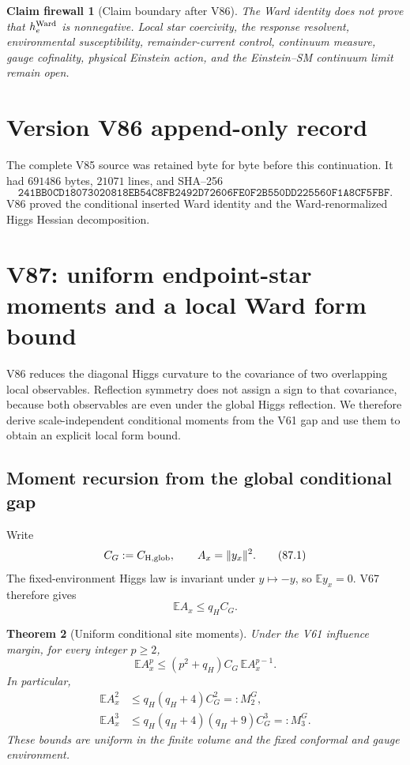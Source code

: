 \documentclass[11pt]{article}
\newtheorem{theorem}{Theorem}[section]
\newtheorem{firewall}[theorem]{Claim firewall}
\theoremstyle{remark}
\begin{document}
\begin{firewall}[Claim boundary after V86]
\label{fire:v17v86}
The Ward identity does not prove that \(h_e^{\rm Ward}\) is
nonnegative.  Local star coercivity, the response resolvent,
environmental susceptibility, remainder-current control, continuum
measure, gauge cofinality, physical Einstein action, and the
Einstein--SM continuum limit remain open.
\end{firewall}

\section*{Version V86 append-only record}
The complete V85 source was retained byte for byte before this
continuation.  It had \(691486\) bytes, \(21071\) lines, and SHA--256
\[
 \texttt{241BB0CD18073020818EB54C8FB2492D72606FE0F2B550DD225560F1A8CF5FBF}.
\]
V86 proved the conditional inserted Ward identity and the
Ward-renormalized Higgs Hessian decomposition.


\section{V87: uniform endpoint-star moments and a local Ward form bound}
\label{sec:v17v87}

V86 reduces the diagonal Higgs curvature to the covariance of two
overlapping local observables.  Reflection symmetry does not assign a
sign to that covariance, because both observables are even under the
global Higgs reflection.  We therefore derive scale-independent
conditional moments from the V61 gap and use them to obtain an explicit
local form bound.

\subsection{Moment recursion from the global conditional gap}

Write
\[
 C_G:=C_{\rm H,glob},
 \qquad A_x=\|y_x\|^2.                             \tag{87.1}
\]
The fixed-environment Higgs law is invariant under
\(y\mapsto-y\), so \(\mathbb Ey_x=0\).  V67 therefore gives
\[
 \mathbb EA_x\leq q_HC_G.                         \tag{87.2}
\]

\begin{theorem}[Uniform conditional site moments]
\label{thm:v17v87-moments}
Under the V61 influence margin, for every integer \(p\geq2\),
\[
\boxed{
 \mathbb EA_x^p
 \leq(p^2+q_H)C_G\,\mathbb EA_x^{p-1}.}           \tag{87.3}
\]
In particular,
\[
\begin{aligned}
 \mathbb EA_x^2
 &\leq q_H(q_H+4)C_G^2=:M_2^G,\\
 \mathbb EA_x^3
 &\leq q_H(q_H+4)(q_H+9)C_G^3=:M_3^G.             \tag{87.4}
\end{aligned}
\]
These bounds are uniform in the finite volume and the fixed conformal
and gauge environment.
\end{theorem}
\end{document}
